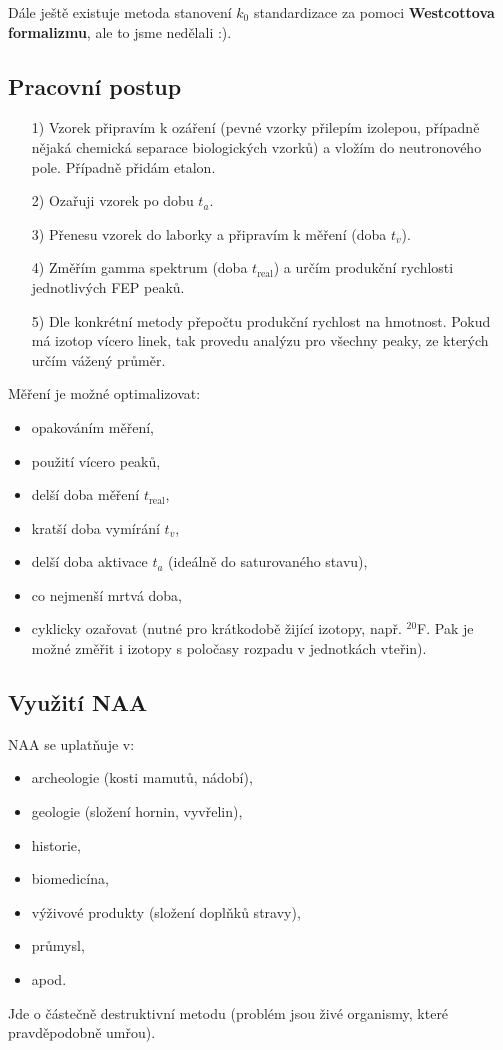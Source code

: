 Dále ještě existuje metoda stanovení $k_0$ standardizace za pomoci \textbf{Westcottova formalizmu}, ale to jsme nedělali :).

\subsection{Pracovní postup}

\begin{itemize}
    \item[1)] Vzorek připravím k ozáření (pevné vzorky přilepím izolepou, případně nějaká chemická separace biologických vzorků) a vložím do neutronového pole. Případně přidám etalon.
    \item[2)] Ozařuji vzorek po dobu $t_a$.
    \item[3)] Přenesu vzorek do laborky a připravím k měření (doba $t_v$).
    \item[4)] Změřím gamma spektrum (doba $t_\text{real}$) a určím produkční rychlosti jednotlivých FEP peaků.
    \item[5)] Dle konkrétní metody přepočtu produkční rychlost na hmotnost. Pokud má izotop vícero linek, tak provedu analýzu pro všechny peaky, ze kterých určím vážený průměr.
\end{itemize}

Měření je možné optimalizovat:

\begin{itemize}
    \item opakováním měření, 
    \item použití vícero peaků,
    \item delší doba měření $t_\text{real}$,
    \item kratší doba vymírání $t_v$,
    \item delší doba aktivace $t_a$ (ideálně do saturovaného stavu),
    \item co nejmenší mrtvá doba,
    \item cyklicky ozařovat (nutné pro krátkodobě žijící izotopy, např. $^{20}$F. Pak je možné změřit i izotopy s poločasy rozpadu v jednotkách vteřin).
\end{itemize}


\subsection{Využití NAA}

NAA se uplatňuje v:

\begin{itemize}
    \item archeologie (kosti mamutů, nádobí),
    \item geologie (složení hornin, vyvřelin),
    \item historie,
    \item biomedicína,
    \item výživové produkty (složení doplňků stravy),
    \item průmysl,
    \item apod.
\end{itemize}

Jde o částečně destruktivní metodu (problém jsou živé organismy, které pravděpodobně umřou).